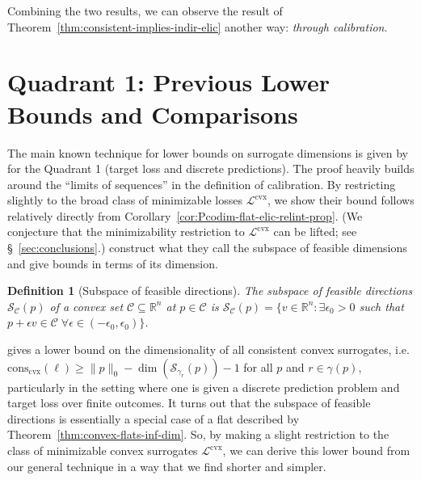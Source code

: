 \documentclass{article} %
\newcommand{\Comments}{0}
\newcommand{\mynote}[2]{\ifnum\Comments=1\textcolor{#1}{#2}\fi}
\newcommand{\mytodo}[2]{\ifnum\Comments=1%
	\todo[linecolor=#1!80!black,backgroundcolor=#1,bordercolor=#1!80!black]{#2}\fi}
\newcommand{\jessiet}[1]{\mytodo{teal!20!white}{JF: #1}}
\newcommand{\bo}[1]{\mynote{blue}{[Bo: #1]}}
\newcommand{\reals}{\mathbb{R}}
\newcommand{\conscvx}{\mathrm{cons}_\mathrm{cvx}}
\newcommand{\C}{\mathcal{C}}
\newcommand{\Lcvx}{\mathcal{L}^{\mathrm{cvx}}}
\newcommand{\Sc}{\mathcal{S}}  %
\newtheorem{definition}{Definition}
\begin{document}
Combining the two results, we can observe the result of Theorem~\ref{thm:consistent-implies-indir-elic} another way: \emph{through calibration}.

\section{Quadrant 1: Previous Lower Bounds and Comparisons}\label{sec:finite-calib}

The main known technique for lower bounds on surrogate dimensions is given by \citet{ramaswamy2016convex} for the Quadrant 1 (target loss and discrete predictions).
The proof heavily builds around the ``limits of sequences'' in the definition of calibration.
By restricting slightly to the broad class of minimizable losses $\Lcvx$, we show their bound follows relatively directly from Corollary~\ref{cor:Pcodim-flat-elic-relint-prop}.
(We conjecture that the minimizability restriction to $\Lcvx$ can be lifted; see \S~\ref{sec:conclusions}.)
\citet{ramaswamy2016convex} construct what they call the subspace of feasible dimensions and give bounds in terms of its dimension.
\begin{definition}[Subspace of feasible directions]\label{def:subspace-feas}
	The \emph{subspace of feasible directions} $\Sc_\C(p)$ of a convex set $\C \subseteq \reals^n$ at $p \in \C$ is $\Sc_\C(p) = \{ v \in \reals^n : \exists \epsilon_0 > 0 $ such that $p + \epsilon v \in \C \; \forall \epsilon \in (-\epsilon_0,\epsilon_0) \}$.
\end{definition}

\citet{ramaswamy2016convex} gives a lower bound on the dimensionality of all consistent convex surrogates, i.e. $\conscvx(\ell) \geq \|p\|_0 - \dim(\Sc_{\gamma_r}(p)) - 1$ for all $p$ and $r \in \gamma(p)$, particularly in the setting where one is given a discrete prediction problem and target loss over finite outcomes.
It turns out that the subspace of feasible directions is essentially a special case of a flat described by Theorem~\ref{thm:convex-flats-inf-dim}.
So, by making a slight restriction to the class of minimizable convex surrogates $\Lcvx$, we can derive this lower bound from our general technique in a way that we find shorter and simpler.
\end{document}
